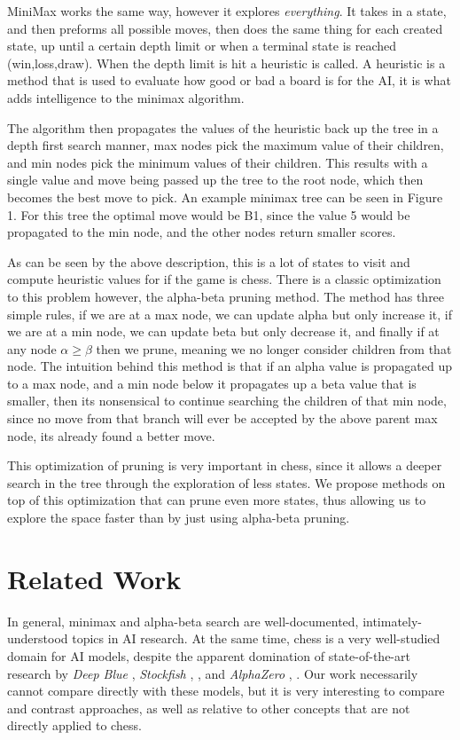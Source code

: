\documentclass[letterpaper]{article}
\begin{document}
MiniMax works the same way, however it explores \textit{everything}. It takes in a state, and then preforms all possible moves, then does the same thing for each created state, up until a certain depth limit or when a terminal state is reached (win,loss,draw). When the depth limit is hit a heuristic is called. A heuristic is a method that is used to evaluate how good or bad a board is for the AI, it is what adds intelligence to the minimax algorithm.

The algorithm then propagates the values of the heuristic back up the tree in a depth first search manner, max nodes pick the maximum value of their children, and min nodes pick the minimum values of their children. This results with a single value and move being passed up the tree to the root node, which then becomes the best move to pick. An example minimax tree can be seen in Figure 1. For this tree the optimal move would be B1, since the value 5 would be propagated to the min node, and the other nodes return smaller scores.

As can be seen by the above description, this is a lot of states to visit and compute heuristic values for if the game is chess. There is a classic optimization to this problem however, the alpha-beta pruning method. The method has three simple rules, if we are at a max node, we can update alpha but only increase it, if we are at a min node, we can update beta but only decrease it, and finally if at any node $\alpha \geq \beta$ then we prune, meaning we no longer consider children from that node. The intuition behind this method is that if an alpha value is propagated up to a max node, and a min node below it propagates up a beta value that is smaller, then its nonsensical to continue searching the children of that min node, since no move from that branch will ever be accepted by the above parent max node, its already found a better move. 

This optimization of pruning is very important in chess, since it allows a deeper search in the tree through the exploration of less states. We propose methods on top of this optimization that can prune even more states, thus allowing us to explore the space faster than by just using alpha-beta pruning. 

\section{Related Work}
In general, minimax and alpha-beta search are well-documented, intimately-understood topics in AI research.  At the same time, chess is a very well-studied domain for AI models, despite the apparent domination of state-of-the-art research by \textit{Deep Blue} \cite{campbell-et-al2002}, \textit{Stockfish} \cite{silver-et-al17}, \cite{grunke2020}, and \textit{AlphaZero} \cite{silver-et-al17}, \cite{grunke2020}.  Our work necessarily cannot compare directly with these models, but it is very interesting to compare and contrast approaches, as well as relative to other concepts that are not directly applied to chess.
\end{document}

